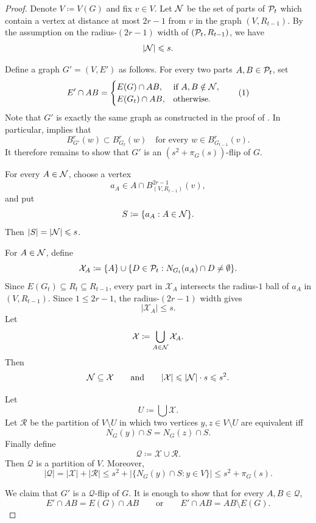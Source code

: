 \begin{proof}
    Denote $V\coloneqq V(G)$ and 
fix \(v\in V\). Let $\cal N$ 
be the set of parts of \(\cal P_t\) which contain a vertex at distance at most
\(2r-1\) from \(v\) in the graph \((V,R_{t-1})\). 
By the assumption on the radius-\((2r-1)\) width of
\((\cal P_t,R_{t-1})\), we have
\[
   |\cal N|\le s.
\]

Define a graph \(G'=(V,E')\) as follows. For every two parts
\(A,B\in\cal P_t\), set
\[
E'\cap AB =
\begin{cases}
E(G)\cap AB, & \text{if } A,B\notin \cal N,\\
E(G_t)\cap AB, & \text{otherwise.}
\end{cases}
\tag{1}\label{eq:poly-Gprime-def}
\]
Note that $G'$ is exactly the same graph as constructed in the proof of . In particular,  implies that 
$$B^r_{G'}(w)\subset B^r_{G_t}(w)\quad\text{for every $w\in B^r_{G_{t-1}}(v)$.}$$
It therefore remains to show that \(G'\) is an \((s^2+\pi_G(s))\)-flip of \(G\).



For every \(A\in\cal N\), choose a vertex
\[
   a_A\in A\cap B^{2r-1}_{(V,R_{t-1})}(v),
\]
and put
\[
   S\coloneqq \{a_A:A\in\cal N\}.
\]
Then \(|S|=|\cal N|\le s\).

For \(A\in\cal N\), define
\[
   \mathcal X_A
   \coloneqq
   \{A\}\cup
   \{D\in\cal P_t:N_{G_t}(a_A)\cap D\neq\emptyset\}.
\]
Since \(E(G_t)\subseteq R_t\subseteq R_{t-1}\), every part in
\(\mathcal X_A\) intersects the radius-\(1\) ball of \(a_A\) in
\((V,R_{t-1})\). Since \(1\le 2r-1\), the radius-\((2r-1)\) width gives
\[
   |\mathcal X_A|\le s.
\]
Let
\[
   \mathcal X\coloneqq \bigcup_{A\in\cal N}\mathcal X_A.
\]
Then
\[
   \cal N\subseteq \mathcal X
   \qquad\text{and}\qquad
   |\mathcal X|\le |\cal N|\cdot s\le s^2.
\]

Let
\[
   U\coloneqq \bigcup \mathcal X.
\]
Let \(\mathcal R\) be the partition of \(V\setminus U\) in which two
vertices \(y,z\in V\setminus U\) are equivalent iff
\[
   N_G(y)\cap S=N_G(z)\cap S.
\]
Finally define
\[
   \mathcal Q\coloneqq \mathcal X\cup\mathcal R.
\]
Then \(\mathcal Q\) is a
partition of \(V\). Moreover,
\[
   |\mathcal Q|
   =
   |\mathcal X|+|\mathcal R|
   \le
   s^2+
   \bigl|\{N_G(y)\cap S:y\in V\}\bigr|
   \le
   s^2+\pi_G(s).
\tag{2}\label{eq:poly-Q-size}
\]

We claim that \(G'\) is a \(\mathcal Q\)-flip of \(G\). It is enough to show
that for every \(A,B\in\mathcal Q\),
\[
   E'\cap AB=E(G)\cap AB
   \qquad\text{or}\qquad
   E'\cap AB=AB\setminus E(G).
\tag{3}\label{eq:poly-flip-check}
\]


\end{proof}
